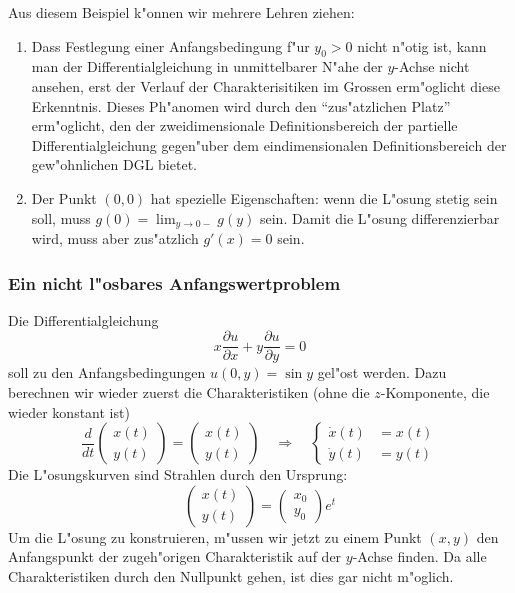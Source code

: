Aus diesem Beispiel k"onnen wir mehrere Lehren ziehen: 
\begin{enumerate}
\item Dass Festlegung einer Anfangsbedingung f"ur $y_0>0$ nicht n"otig ist,
kann man der Differentialgleichung in unmittelbarer N"ahe der $y$-Achse nicht
ansehen, erst der Verlauf der Charakterisitiken im Grossen erm"oglicht
diese Erkenntnis. Dieses Ph"anomen wird durch den ``zus"atzlichen Platz''
erm"oglicht, den der zweidimensionale Definitionsbereich der partielle Differentialgleichung gegen"uber dem
eindimensionalen Definitionsbereich der gew"ohnlichen DGL bietet.
\item Der Punkt $(0,0)$ hat spezielle Eigenschaften: wenn die L"osung stetig
sein soll, muss $g(0)=\lim_{y\to 0-} g(y)$ sein. Damit die L"osung differenzierbar
wird, muss aber zus"atzlich $g'(x)=0$ sein.
\end{enumerate}

\subsubsection{Ein nicht l"osbares Anfangswertproblem\label{unloesbar}}
Die Differentialgleichung
\[
x\frac{\partial u}{\partial x}
+
y\frac{\partial u}{\partial y}
=0
\]
soll zu den Anfangsbedingungen $u(0,y)=\sin y$ gel"ost werden.
Dazu berechnen wir wieder zuerst die Charakteristiken (ohne die 
$z$-Komponente, die wieder konstant ist)
\[
\frac{d}{dt}
\begin{pmatrix}
x(t)\\y(t)
\end{pmatrix}
=
\begin{pmatrix}
x(t)\\y(t)
\end{pmatrix}
\quad
\Rightarrow
\quad
\left\{
\begin{aligned}
\dot x(t)&=x(t)\\
\dot y(t)&=y(t)
\end{aligned}
\right.
\]
Die L"osungskurven sind Strahlen durch den Ursprung:
\[
\begin{pmatrix}
x(t)\\y(t)
\end{pmatrix}
=\begin{pmatrix}x_0\\y_0\end{pmatrix}e^t
\]
Um die L"osung zu konstruieren, m"ussen wir jetzt zu einem Punkt
$(x,y)$ den Anfangspunkt der zugeh"origen Charakteristik auf der $y$-Achse
finden. Da alle Charakteristiken durch den Nullpunkt gehen, ist dies 
gar nicht m"oglich. 

